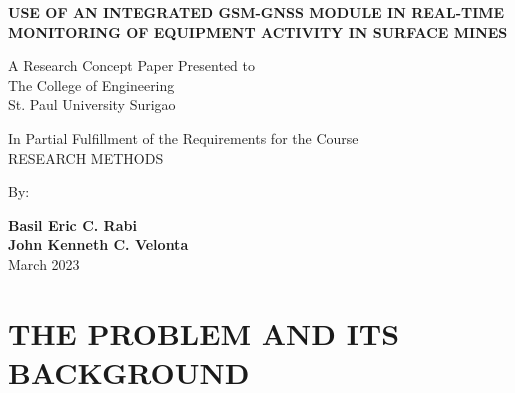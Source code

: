 \documentclass[12pt]{report}
\newcommand{\authora}{
    Basil Eric C. Rabi %
}
\newcommand{\authorb}{
    John Kenneth C. Velonta %
}
\newcommand{\thetitle}{Use of an Integrated GSM-GNSS Module in Real-Time Monitoring of Equipment Activity in Surface Mines}
\begin{document}
\thispagestyle{empty}

\begin{center}

\vspace*{1cm}
\textbf{\MakeUppercase{\thetitle}}

\vspace{1.5cm}
A Research Concept Paper Presented to \\
The College of Engineering \\
St. Paul University Surigao

\vfill

In Partial Fulfillment of the Requirements for the Course \\
RESEARCH METHODS

\vspace{1cm}
By:

\vspace{1cm}
\textbf{\authora} \\
\textbf{\authorb} \\

\vspace{1cm}
March 2023

\end{center}


\pagestyle{fancy}
\fancyhead{}
\fancyfoot{}
\fancyhead[R]{\thepage}

\tableofcontents


\chapter{THE PROBLEM AND ITS BACKGROUND}
\end{document}
